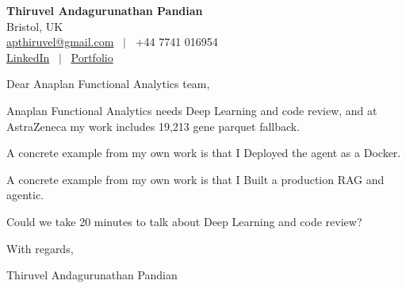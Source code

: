 \documentclass[11pt,a4paper]{article}
\begin{document}
\raggedright
\pagestyle{empty}

\begin{center}
    {\LARGE \color{linkblue} \textbf{Thiruvel Andagurunathan Pandian}}\\[0.2cm]
    Bristol, UK \\
    \href{mailto:apthiruvel@gmail.com}{apthiruvel@gmail.com} \ $|$ \ +44 7741 016954 \\
\href{https://www.linkedin.com/in/thiruvel-a-p/}{LinkedIn} \ $|$ \ \href{https://thiruvel-ap.github.io/PersonalPortfolio/}{Portfolio}
\end{center}

\vspace{0.4cm}

\noindent
Dear Anaplan Functional Analytics team,

Anaplan Functional Analytics needs Deep Learning and code review, and at AstraZeneca my work includes 19,213 gene parquet fallback.

A concrete example from my own work is that I Deployed the agent as a Docker.

A concrete example from my own work is that I Built a production RAG and agentic.

Could we take 20 minutes to talk about Deep Learning and code review?

\vspace{0.5cm}

With regards,

Thiruvel Andagurunathan Pandian
\end{document}
